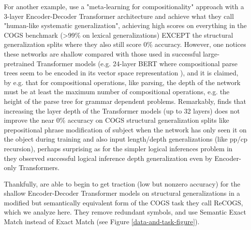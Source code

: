 \documentclass[11pt]{article}
\begin{document}
For another example, \citep{lake2023human} use a "meta-learning for compositionality" approach with a 3-layer Encoder-Decoder Transformer architecture and achieve what they call "human-like systematic generalization", achieving high scores on everything in the COGS benchmark (>99\% on lexical generalizations) EXCEPT the structural generalization splits where they also still score 0\% accuracy.
However, one notices these networks are shallow compared with those used in successful large-pretrained Transformer models (e.g. 24-layer BERT where compositional parse trees seem to be encoded in its vector space representation \citep{hewitt-manning-2019-structural}), and it is claimed, by e.g. \citep{Csordas2022} that for compositional operations, like parsing, the depth of the network must be at least the maximum number of compositional operations, e.g. the height of the parse tree for grammar dependent problems. Remarkably, \citep{petty2024impactdepthcompositionalgeneralization} finds that increasing the layer depth of the Transformer models (up to 32 layers) does not improve the near 0\% accuracy on COGS structural generalization splits like prepositional phrase modification of subject when the network has only seen it on the object during training and also input length/depth generalizations (like pp/cp recursion), perhaps surprising as for the simpler logical inferences problem in \citep{Clark2020} they observed successful logical inference depth generalization even by Encoder-only Transformers.

Thankfully, \citep{Wu2023} are able to begin to get traction (low but nonzero accuracy) for the shallow Encoder-Decoder Transformer models on structural generalizations in a modified but semantically equivalent form of the COGS task they call ReCOGS, which we analyze here. They remove redundant symbols, and use Semantic Exact Match instead of Exact Match (see Figure \ref{data-and-task-figure}).

\end{document}
